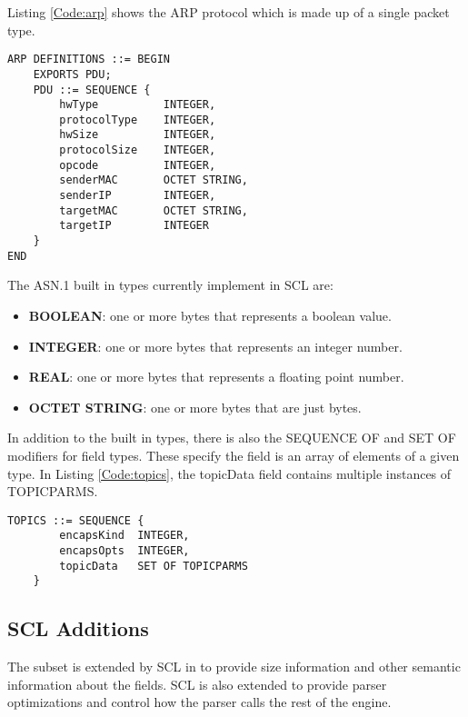 \documentclass[12pt,oneside,letterpaper]{article}
\begin{document}
Listing \ref{Code:arp} shows the ARP protocol which is made up of a single packet type.

\begin{lstlisting}[language=SCL2,style=mystyle,frame=none,
caption=ASN.1 Subset for ARP Message,label=Code:arp, xleftmargin=3.5ex]
ARP DEFINITIONS ::= BEGIN
    EXPORTS PDU;
    PDU ::= SEQUENCE {
        hwType          INTEGER,
        protocolType    INTEGER,
        hwSize          INTEGER,
        protocolSize    INTEGER,
        opcode          INTEGER,
        senderMAC       OCTET STRING,
        senderIP        INTEGER,
        targetMAC       OCTET STRING,
        targetIP        INTEGER
    } 
END
\end{lstlisting}

The ASN.1 built in types currently implement in SCL are:

\begin{itemize}
    \item \textbf{BOOLEAN}: one or more bytes that represents a boolean value.
    \item \textbf{INTEGER}: one or more bytes that represents an integer number.
    \item \textbf{REAL}: one or more bytes that represents a floating point number.
    \item \textbf{OCTET STRING}: one or more bytes that are just bytes.
\end{itemize}

In addition to the built in types, there is also the SEQUENCE OF and SET OF modifiers for field types. These specify the field is an array of elements of a given type. In Listing \ref{Code:topics}, the topicData field contains multiple instances of TOPICPARMS.

\begin{lstlisting}[language=SCL2,style=mystyle,frame=none,
caption=Example SET OF Modifier,label=Code:topics, xleftmargin=3.5ex]
    TOPICS ::= SEQUENCE {
        encapsKind  INTEGER,
        encapsOpts  INTEGER,
        topicData   SET OF TOPICPARMS
    }
\end{lstlisting}

\subsection{SCL Additions}
\label{sec:SCLAdd}

The subset is extended by SCL in to provide size information and other semantic information about the fields. SCL is also extended to provide parser optimizations and control how the parser calls the rest of the engine.
\end{document}
